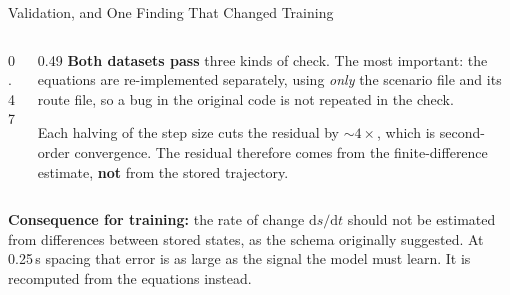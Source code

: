 \begin{frame}{Validation, and One Finding That Changed Training}
  \vspace{0.2em}
  \begin{columns}[T,onlytextwidth]
    \begin{column}{0.47\textwidth}
      \vspace{0.5em}
      \scalebox{0.86}{\fdConvergenceChart}
    \end{column}
    \begin{column}{0.49\textwidth}
      \vspace{0.2em}
      \small
      \textbf{Both datasets pass} three kinds of check. The most important:
      the equations are re-implemented separately, using \emph{only} the
      scenario file and its route file, so \alert{a bug in the original code
      is not repeated in the check}.

      \vspace{0.7em}
      Each halving of the step size cuts the residual by ${\sim}4\times$, which
      is second-order convergence. The residual therefore comes from the
      finite-difference estimate, \textbf{not} from the stored trajectory.
    \end{column}
  \end{columns}

  \vspace{0.4em}
  \begin{minipage}{0.96\textwidth}\footnotesize
    \textbf{Consequence for training:} the rate of change
    $\mathrm{d}s/\mathrm{d}t$ should not be estimated from differences between
    stored states, as the schema originally suggested. At 0.25\,s spacing that
    error is \alert{as large as the signal the model must learn}. It is
    recomputed from the equations instead.
  \end{minipage}
\end{frame}


